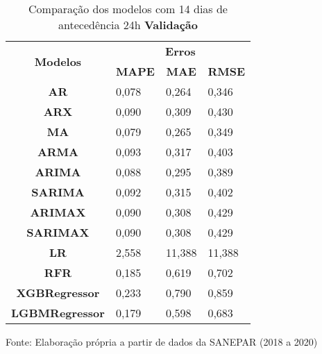 \begin{table}[H]
	\centering
	\caption{Comparação dos modelos com 14 dias de antecedência 24h \textbf{Validação} }\label{tb:30-24vld}
	\begin{tabular}{@{}clll@{}}
		\toprule
		\multirow{2}{*}{\textbf{Modelos}} & \multicolumn{3}{c}{\textbf{Erros}}                                                                       \\ \cmidrule(l){2-4} 
		& \multicolumn{1}{c}{\textbf{MAPE}} & \multicolumn{1}{c}{\textbf{MAE}} & \multicolumn{1}{c}{\textbf{RMSE}} \\ \hline
\textbf{AR}                       & 0,078                             & 0,264                            & 0,346                             \\
\textbf{ARX}                      & 0,090                             & 0,309                            & 0,430                             \\
\textbf{MA}                       & 0,079                             & 0,265                            & 0,349                             \\
\textbf{ARMA}                     & 0,093                             & 0,317                            & 0,403                             \\
\textbf{ARIMA}                    & 0,088                             & 0,295                            & 0,389                             \\
\textbf{SARIMA}                   & 0,092                             & 0,315                            & 0,402                             \\
\textbf{ARIMAX}                   & 0,090                             & 0,308                            & 0,429                             \\
\textbf{SARIMAX}                  & 0,090                             & 0,308                            & 0,429                             \\
\textbf{LR}                       & 2,558                             & 11,388                           & 11,388                            \\
\textbf{RFR}                      & 0,185                             & 0,619                            & 0,702                             \\
\textbf{XGBRegressor}             & 0,233                             & 0,790                            & 0,859                             \\
\textbf{LGBMRegressor}            & 0,179                             & 0,598                            & 0,683                             \\ \bottomrule
	\end{tabular}

Fonte: Elaboração própria a partir de dados da SANEPAR (2018 a 2020)
\end{table}

